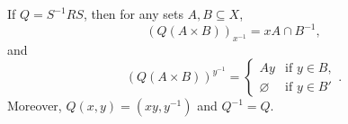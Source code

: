 If $Q = S^{-1}RS$, then for any sets $A, B \subseteq X$,
$$(Q(A \times B))_{x^{-1}} = xA \cap B^{-1},$$
and
$$(Q(A \times B))^{y^{-1}} = \begin{cases} Ay & \text{if } y \in B, \\ \varnothing & \text{if } y \in B' \end{cases}.$$
Moreover, $Q(x,y) = (xy, y^{-1})$ and $Q^{-1} = Q$.
